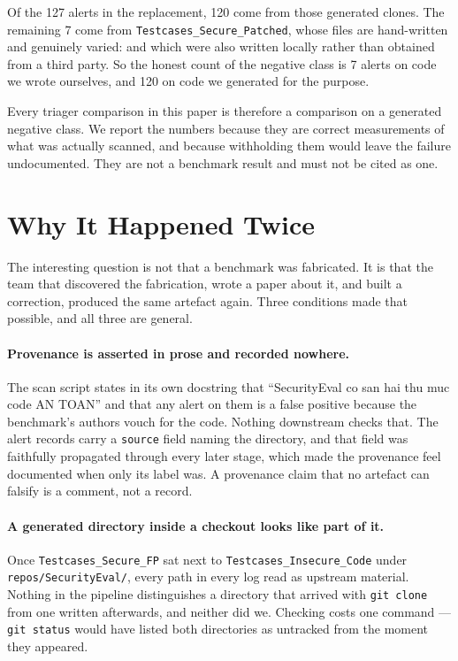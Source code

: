 \documentclass[journal]{IEEEtran}
\theoremstyle{definition}
\newcommand{\RNfp}{127}
\newcommand{\CFpSecure}{120}
\newcommand{\CFpPatched}{7}
\begin{document}
Of the \RNfp{} alerts in the replacement, \CFpSecure{} come from those generated
clones. The remaining \CFpPatched{} come from \texttt{Testcases\_\allowbreak{}Secure\_\allowbreak{}Patched},
whose files are hand-written and genuinely varied: and which were also written
locally rather than obtained from a third party. So the honest count of the
negative class is \CFpPatched{} alerts on code we wrote ourselves, and
\CFpSecure{} on code we generated for the purpose.

Every triager comparison in this paper is therefore a comparison on a generated
negative class. We report the numbers because they are correct measurements of
what was actually scanned, and because withholding them would leave the failure
undocumented. They are not a benchmark result and must not be cited as one.

\section{Why It Happened Twice}
\label{sec:whytwice}

The interesting question is not that a benchmark was fabricated. It is that the
team that discovered the fabrication, wrote a paper about it, and built a
correction, produced the same artefact again. Three conditions made that
possible, and all three are general.

\paragraph{Provenance is asserted in prose and recorded nowhere.}
The scan script states in its own docstring that
``SecurityEval co san hai thu muc code AN TOAN'' and that any alert on them is a
false positive because the benchmark's authors vouch for the code. Nothing
downstream checks that. The alert records carry a \texttt{source} field naming
the directory, and that field was faithfully propagated through every later
stage, which made the provenance feel documented when only its label was. A
provenance claim that no artefact can falsify is a comment, not a record.

\paragraph{A generated directory inside a checkout looks like part of it.}
Once \texttt{Testcases\_\allowbreak{}Secure\_\allowbreak{}FP} sat next to
\texttt{Testcases\_\allowbreak{}Insecure\_\allowbreak{}Code} under \texttt{repos/\allowbreak{}SecurityEval/}, every path
in every log read as upstream material. Nothing in the pipeline distinguishes a
directory that arrived with \texttt{git clone} from one written afterwards, and
neither did we. Checking costs one command --- \texttt{git status} would have
listed both directories as untracked from the moment they appeared.
\end{document}

